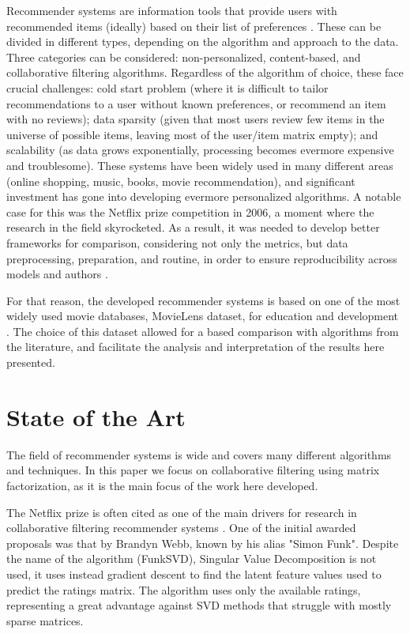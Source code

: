 \documentclass[conference]{IEEEtran}
\begin{document}

Recommender systems are information tools that provide users with recommended items (ideally) based on their list of preferences \cite{Konstan2012,KATARYA2017105}. These can be divided in different types, depending on the algorithm and approach to the data. Three categories can be considered: non-personalized, content-based, and collaborative filtering algorithms. Regardless of the algorithm of choice, these face crucial challenges: cold start problem (where it is difficult to tailor recommendations to a user without known preferences, or recommend an item with no reviews); data sparsity (given that most users review few items in the universe of possible items, leaving most of the user/item matrix empty); and scalability (as data grows exponentially, processing becomes evermore expensive and troublesome). These systems have been widely used in many different areas (online shopping, music, books, movie recommendation), and significant investment has gone into developing evermore personalized algorithms. A notable case for this was the Netflix prize competition in 2006, a moment where the research in the field skyrocketed. As a result, it was needed to develop better frameworks for comparison, considering not only the metrics, but data preprocessing, preparation, and routine, in order to ensure reproducibility across models and authors \cite{10.1145/2645710.2645746}.

For that reason, the developed recommender systems is based on one of the most widely used movie databases, MovieLens dataset, for education and development \cite{Harper2015}. The choice of this dataset allowed for a based comparison with algorithms from the literature, and facilitate the analysis and interpretation of the results here presented. 

\section{State of the Art}

The field of recommender systems is wide and covers many different algorithms and techniques. In this paper we focus on collaborative filtering using matrix factorization, as it is the main focus of the work here developed.

The Netflix prize is often cited as one of the main drivers for research in collaborative filtering recommender systems \cite{netflix_prize_2009}. One of the initial awarded proposals was that by Brandyn Webb, known by his alias "Simon Funk". Despite the name of the algorithm (FunkSVD), Singular Value Decomposition is not used, it uses instead gradient descent to find the latent feature values used to predict the ratings matrix. The algorithm uses only the available ratings, representing a great advantage against SVD methods that struggle with mostly sparse matrices. 
\end{document}
